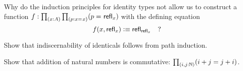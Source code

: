 \begin{ex}\label{ex:without-K}
  Why do the induction principles for identity types not allow us to construct a function $f: \prd{x:A}{p:\id{x}{x}} (\id{p}{\refl{x}})$ with the defining equation
  \[ f(x,\mathsf{refl}_{x}) \vcentcolon\equiv \mathsf{refl}_{\mathsf{refl}_{x}} \quad ?\]
\end{ex}

\begin{ex}\label{ex:subtFromPathInd}
  Show that indiscernability of identicals follows from path induction.  
\end{ex}

\begin{ex}\label{ex:add-nat-commutative}
  Show that addition of natural numbers is commutative: $\prd{i,j:\nat} (i+j=j+i)$.
\end{ex}

